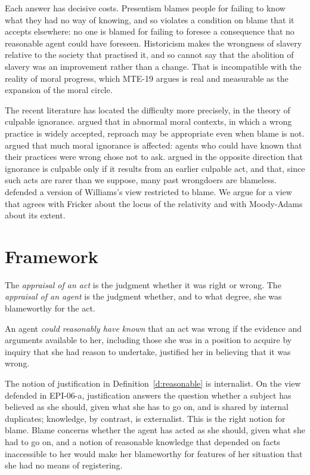 \documentclass{situationist-preprint}
\begin{document}
Each answer has decisive costs. Presentism blames people for failing to know what they had no way of knowing, and so violates a condition on blame that it accepts elsewhere: no one is blamed for failing to foresee a consequence that no reasonable agent could have foreseen. Historicism makes the wrongness of slavery relative to the society that practised it, and so cannot say that the abolition of slavery was an improvement rather than a change. That is incompatible with the reality of moral progress, which MTE-19 argues is real and measurable as the expansion of the moral circle.

The recent literature has located the difficulty more precisely, in the theory of culpable ignorance. \citet{Calhoun1989} argued that in abnormal moral contexts, in which a wrong practice is widely accepted, reproach may be appropriate even when blame is not. \citet{MoodyAdams1994} argued that much moral ignorance is affected: agents who could have known that their practices were wrong chose not to ask. \citet{Rosen2003} argued in the opposite direction that ignorance is culpable only if it results from an earlier culpable act, and that, since such acts are rarer than we suppose, many past wrongdoers are blameless. \citet{Fricker2010} defended a version of Williams's view restricted to blame. We argue for a view that agrees with Fricker about the locus of the relativity and with Moody-Adams about its extent.

\section{Framework}

\begin{definition}\label{d:appraisals}
The \emph{appraisal of an act} is the judgment whether it was right or wrong. The \emph{appraisal of an agent} is the judgment whether, and to what degree, she was blameworthy for the act.
\end{definition}

\begin{definition}\label{d:reasonable}
An agent \emph{could reasonably have known} that an act was wrong if the evidence and arguments available to her, including those she was in a position to acquire by inquiry that she had reason to undertake, justified her in believing that it was wrong.
\end{definition}

The notion of justification in Definition~\ref{d:reasonable} is internalist. On the view defended in EPI-06-a, justification answers the question whether a subject has believed as she should, given what she has to go on, and is shared by internal duplicates; knowledge, by contrast, is externalist. This is the right notion for blame. Blame concerns whether the agent has acted as she should, given what she had to go on, and a notion of reasonable knowledge that depended on facts inaccessible to her would make her blameworthy for features of her situation that she had no means of registering.
\end{document}
